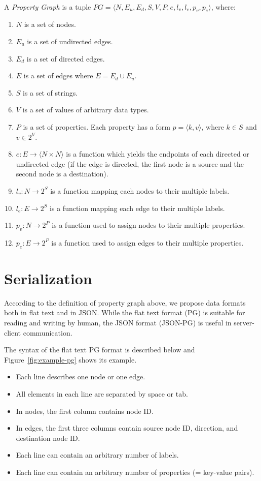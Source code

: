 \documentclass[runningheads]{llncs}
\begin{document}
\begin{defi}
\leavevmode \vspace{1mm} \\
A \emph{Property Graph} is a tuple
$PG = \langle N, E_u, E_d, S, V, P, e, l_v, l_e, p_v, p_e\rangle$, where:
\begin{enumerate}
    \item $N$ is a set of nodes.
    \item $E_u$ is a set of undirected edges.
    \item $E_d$ is a set of directed edges.
    \item $E$ is a set of edges where $E = E_d \cup E_u$.
    \item $S$ is a set of strings.
    \item $V$ is a set of values of arbitrary data types.
    \item $P$ is a set of properties. Each property has a form $p = \langle k,v \rangle$, where $k \in S$ and $v \in 2^V$.
    \item $e: E \to \langle N \times N \rangle$ is a function which yields the endpoints of each directed or undirected edge (if the edge is directed, the first node is a source and the second node is a destination).
    \item $l_v : N \to 2^S$ is a function mapping each nodes to their multiple labels.
    \item $l_e : E \to 2^S$ is a function mapping each edge to their multiple labels.
    \item $p_v : N \to 2^P$ is a function used to assign nodes to their multiple properties.
    \item $p_e : E \to 2^P$ is a function used to assign edges to their multiple properties.
\end{enumerate}
\end{defi}

\section{Serialization}
According to the definition of property graph above, we propose data formats both in flat text and in JSON. While the flat text format (PG) is suitable for reading and writing by human, the JSON format (JSON-PG) is useful in server-client communication.

The syntax of the flat text PG format is described below and Figure~\ref{fig:example-pg} shows its example.

\begin{itemize}
    \item Each line describes one node or one edge.
    \item All elements in each line are separated by space or tab.
    \item In nodes, the first column contains node ID.
    \item In edges, the first three columns contain source node ID, direction, and destination node ID.
    \item Each line can contain an arbitrary number of labels.
    \item Each line can contain an arbitrary number of properties (= key-value pairs).
\end{itemize}
\end{document}
